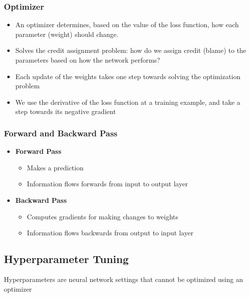 \documentclass[11pt]{article}
\begin{document}
\subsubsection{Optimizer}
\begin{itemize}
\item An optimizer determines, based on the value of the loss function, how each parameter (weight) should change.
\item Solves the credit assignment problem: how do we assign credit (blame) to the parameters based on how the network performs?
\item Each update of the weights takes one step towards solving the optimization problem
\item We use the derivative of the loss function at a training example, and take a step towards its negative gradient
\end{itemize}
\subsubsection{Forward and Backward Pass}
\begin{itemize}
\item\textbf{Forward Pass}
\begin{itemize}
\item Makes a prediction
\item Information flows forwards from input to
output layer
\end{itemize}
\item \textbf{Backward Pass}
\begin{itemize}
\item Computes gradients for making changes to weights
\item Information flows backwards from output to input layer
\end{itemize}
\end{itemize}

\subsection{Hyperparameter Tuning}
Hyperparameters are neural network settings that cannot be optimized using an optimizer
\end{document}
